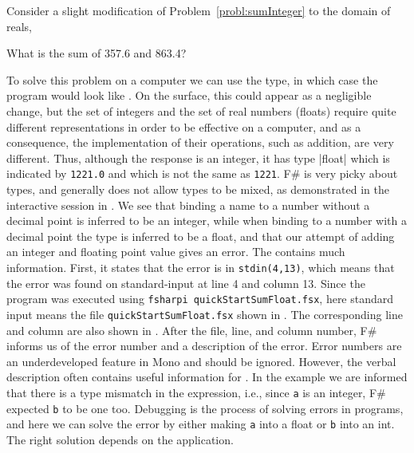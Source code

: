 \documentclass[springer.tex]{subfiles}
\begin{document}
Consider a slight modification of Problem~\ref{probl:sumInteger} to the domain of reals,
%
\begin{task}{}
  What is the sum of 357.6 and 863.4?
\end{task}
%
To solve this problem on a computer we can use the  type, in which case the program would look like .
%
%
On the surface, this could appear as a negligible change, but the set of integers and the set of real numbers (floats) require quite different representations in order to be effective on a computer, and as a consequence, the implementation of their operations, such as addition, are very different. Thus, although the response is an integer, it has type \keyword|float| which is indicated by \lstinline|1221.0| and which is not the same as \lstinline|1221|. F\# is very picky about types, and generally does not allow types to be mixed, as demonstrated in the interactive session in .
%
%
We see that binding a name to a number without a decimal point is inferred to be an integer, while when binding to a number with a decimal point the type is inferred to be a float, and that our attempt of adding an integer and floating point value gives an error. The  contains much information. First, it states that the error is in \lstinline[language=console]{stdin(4,13)}, which means that the error was found on standard-input at line 4 and column 13. Since the program was executed using \lstinline[language=console]{fsharpi quickStartSumFloat.fsx}, here standard input means the file \lstinline[language=console]{quickStartSumFloat.fsx} shown in . The corresponding line and column are also shown in . After the file, line, and column number, F\# informs us of the error number and a description of the error. Error numbers are an underdeveloped feature in Mono and should be ignored. However, the verbal description often contains useful information for . In the example we are informed that there is a type mismatch in the expression, i.e., since \lstinline{a} is an integer, F\# expected \lstinline{b} to be one too. Debugging is the process of solving errors in programs, and here we can solve the error by either making \lstinline{a} into a float or \lstinline{b} into an int. The right solution depends on the application.
\end{document}
